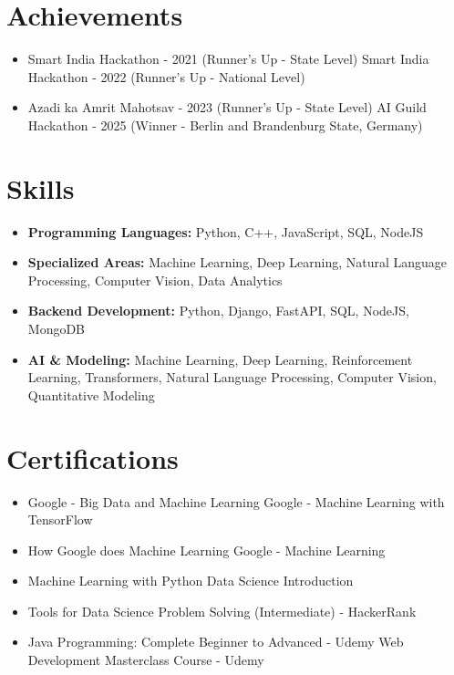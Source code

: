 \documentclass[a4paper,10pt]{article}
\begin{document}
\section*{Achievements}
\begin{itemize}
\item Smart India Hackathon - 2021 (Runner's Up - State Level) \hfill Smart India Hackathon - 2022 (Runner's Up - National Level)
\item Azadi ka Amrit Mahotsav - 2023 (Runner's Up - State Level) \hfill AI Guild Hackathon - 2025 (Winner - Berlin and Brandenburg State, Germany)
\end{itemize}

\section*{Skills}
\begin{itemize}
  \item \textbf{Programming Languages:} Python, C++, JavaScript, SQL, NodeJS
  \item \textbf{Specialized Areas:} Machine Learning, Deep Learning, Natural Language Processing, Computer Vision, Data Analytics
  \item \textbf{Backend Development:} Python, Django, FastAPI, SQL, NodeJS, MongoDB
  \item \textbf{AI \& Modeling:} Machine Learning, Deep Learning, Reinforcement Learning, Transformers, Natural Language Processing, Computer Vision, Quantitative Modeling
\end{itemize}

\section*{Certifications}
\begin{itemize}
\item Google - Big Data and Machine Learning \hfill Google - Machine Learning with TensorFlow
\item How Google does Machine Learning \hfill Google - Machine Learning
\item Machine Learning with Python \hfill Data Science Introduction
\item Tools for Data Science \hfill Problem Solving (Intermediate) - HackerRank
\item Java Programming: Complete Beginner to Advanced - Udemy \hfill Web Development Masterclass Course - Udemy
\end{itemize}
\end{document}

